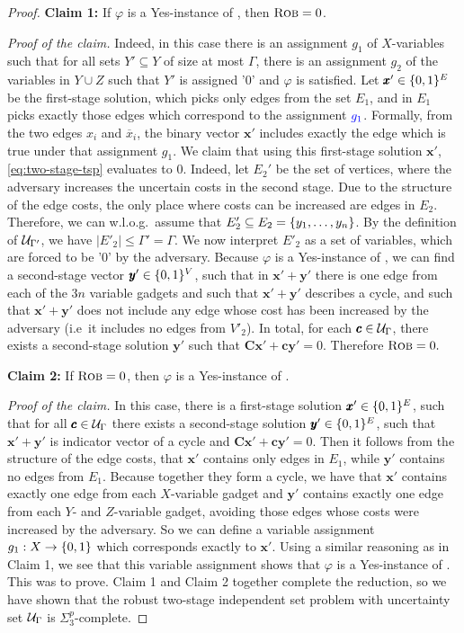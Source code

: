 \begin{proof}
\textbf{Claim 1:} If $\varphi$ is a Yes-instance of {\radj}, then $\textsc{Rob} = 0$. 

\emph{Proof of the claim.} Indeed, in this case there is an assignment $g_1$ of $X$-variables such that for all sets $Y' \subseteq Y$ of size at most $\Gamma$, there is an assignment $g_2$ of the variables in $Y \cup Z$ such that $Y'$ is assigned '$0$' and $\varphi$ is satisfied. 
Let $\pmb x' \in \{ 0,1 \}^E$ be the first-stage solution, which picks only edges from the set $E_1$, and in $E_1$ picks exactly those edges which correspond to the assignment $\textcolor{blue}{g_1}$. Formally, from the two edges $x_i$ and $\overline{x}_i$, the binary vector $\pmb x'$ includes exactly the edge which is true under that assignment $g_1$. 
We claim that using this first-stage solution $\pmb x'$, \cref{eq:two-stage-tsp} evaluates to $0$. 
Indeed, let $E_2'$ be the set of vertices, where the adversary increases the uncertain costs in the second stage. 
Due to the structure of the  edge costs, the only place where costs can be increased are edges in $E_2$. Therefore, we can w.l.o.g.\ assume that $E_2' \subseteq E_2 = \{ y_1, \ldots, y_n \}$. 
By the definition of $\mathcal{U}_{\Gamma'}$, we have $|E'_2| \leq \Gamma' = \Gamma$. 
We now interpret $E'_2$ as a set of variables, which are forced to be '0' by the adversary.
Because $\varphi$ is a Yes-instance of {\radj}, we can find a second-stage vector $\pmb y' \in \{ 0,1 \}^V$, such that in $\pmb x' + \pmb y'$ there is one edge from each of the $3n$ variable gadgets and such that $\pmb x' + \pmb y'$ describes a  cycle, and such that $\pmb x' + \pmb y'$ does not include any edge whose cost has been increased by the adversary (i.e\ it includes no edges from $V'_2$).
In total, for each $\pmb c \in \mathcal{U}_\Gamma$, there exists a second-stage solution $\pmb y'$ such that $\pmb C \pmb x' + \pmb c \pmb y' = 0$. 
Therefore $\textsc{Rob} = 0.$

\textbf{Claim 2:} If $\textsc{Rob} = 0$, then $\varphi$ is a Yes-instance of {\radj}. 

\emph{Proof of the claim.} 
In this case, there is a first-stage solution $\pmb x' \in \{ 0,1 \}^E$, such that for all $\pmb c \in \mathcal{U}_\Gamma$ there exists a second-stage solution $\pmb y' \in \{ 0,1 \}^E$, 
such that $\pmb x'  + \pmb y'$ is indicator vector of a  cycle and $\pmb C\pmb x' + \pmb c\pmb y' = 0$.
Then it follows from the structure of the edge costs, that $\pmb x'$ contains only edges in $E_1$, while $\pmb y'$ contains no edges from $E_1$. Because together they form a  cycle, we have that $\pmb x'$ contains exactly one edge from each $X$-variable gadget and $\pmb y'$ contains exactly one edge from each $Y$- and $Z$-variable gadget, avoiding those edges whose costs were increased by the adversary.
So we can define a variable assignment $g_1 : X \rightarrow \{ 0,1 \}$ which corresponds exactly to $\pmb x'$. 
Using a similar reasoning as in Claim 1, we see that this variable assignment shows that $\varphi$ is a Yes-instance of {\radj}. 
This was to prove. Claim 1 and Claim 2 together complete the reduction, so we have shown that the robust two-stage independent set problem with uncertainty set $\mathcal{U}_\Gamma$ is $\Sigma_3^p$-complete.
\end{proof}

